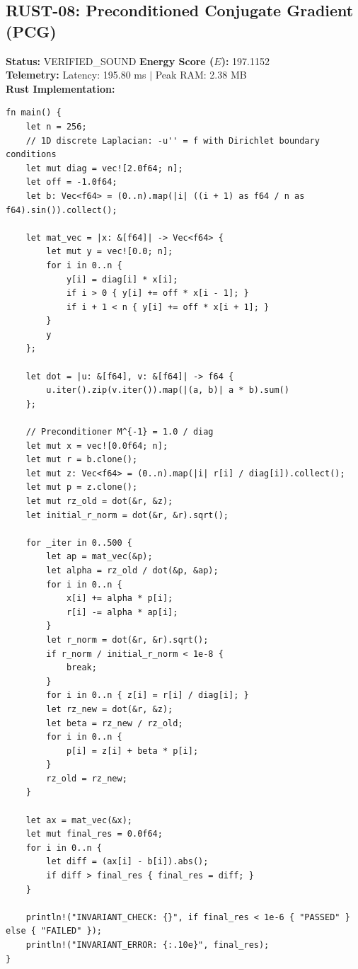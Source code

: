 \documentclass[11pt, a4paper]{article}
\begin{document}
\subsection{RUST-08: Preconditioned Conjugate Gradient (PCG)}
\textbf{Status:} VERIFIED\_SOUND \hfill \textbf{Energy Score ($E$):} 197.1152\\
\textbf{Telemetry:} Latency: 195.80 ms $|$ Peak RAM: 2.38 MB\\
\textbf{Rust Implementation:}
\begin{verbatim}
fn main() {
    let n = 256;
    // 1D discrete Laplacian: -u'' = f with Dirichlet boundary conditions
    let mut diag = vec![2.0f64; n];
    let off = -1.0f64;
    let b: Vec<f64> = (0..n).map(|i| ((i + 1) as f64 / n as f64).sin()).collect();

    let mat_vec = |x: &[f64]| -> Vec<f64> {
        let mut y = vec![0.0; n];
        for i in 0..n {
            y[i] = diag[i] * x[i];
            if i > 0 { y[i] += off * x[i - 1]; }
            if i + 1 < n { y[i] += off * x[i + 1]; }
        }
        y
    };

    let dot = |u: &[f64], v: &[f64]| -> f64 {
        u.iter().zip(v.iter()).map(|(a, b)| a * b).sum()
    };

    // Preconditioner M^{-1} = 1.0 / diag
    let mut x = vec![0.0f64; n];
    let mut r = b.clone();
    let mut z: Vec<f64> = (0..n).map(|i| r[i] / diag[i]).collect();
    let mut p = z.clone();
    let mut rz_old = dot(&r, &z);
    let initial_r_norm = dot(&r, &r).sqrt();

    for _iter in 0..500 {
        let ap = mat_vec(&p);
        let alpha = rz_old / dot(&p, &ap);
        for i in 0..n {
            x[i] += alpha * p[i];
            r[i] -= alpha * ap[i];
        }
        let r_norm = dot(&r, &r).sqrt();
        if r_norm / initial_r_norm < 1e-8 {
            break;
        }
        for i in 0..n { z[i] = r[i] / diag[i]; }
        let rz_new = dot(&r, &z);
        let beta = rz_new / rz_old;
        for i in 0..n {
            p[i] = z[i] + beta * p[i];
        }
        rz_old = rz_new;
    }

    let ax = mat_vec(&x);
    let mut final_res = 0.0f64;
    for i in 0..n {
        let diff = (ax[i] - b[i]).abs();
        if diff > final_res { final_res = diff; }
    }

    println!("INVARIANT_CHECK: {}", if final_res < 1e-6 { "PASSED" } else { "FAILED" });
    println!("INVARIANT_ERROR: {:.10e}", final_res);
}
\end{verbatim}
\end{document}
